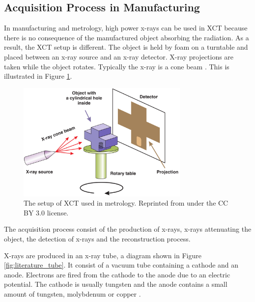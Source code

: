 \subsection{Acquisition Process in Manufacturing}

In manufacturing and metrology, high power x-rays can be used in XCT because there is no consequence of the manufactured object absorbing the radiation. As a result, the XCT setup is different. The object is held by foam on a turntable and placed between an x-ray source and an x-ray detector. X-ray projections are taken while the object rotates. Typically the x-ray is a cone beam \citep{kruth2011computed}. This is illustrated in Figure \ref{fig:literature_xct}.

\begin{figure}
  \centering
  \includegraphics[width=0.75\textwidth]{../figures/literatureReview/literature_xct.png}
  \caption{The setup of XCT used in metrology. Reprinted from \cite{warnett2016towards} under the CC BY 3.0 license.}
  \label{fig:literature_xct}
\end{figure}

The acquisition process consist of the production of x-rays, x-rays attenuating the object, the detection of x-rays and the reconstruction process.

X-rays \citep{rontgen1896on} are produced in an x-ray tube, a diagram shown in Figure \ref{fig:literature_tube}. It consist of a vacuum tube containing a cathode and an anode. Electrons are fired from the cathode to the anode due to an electric potential. The cathode is usually tungsten and the anode contains a small amount of tungsten, molybdenum or copper \citep{sun2012overview}.

